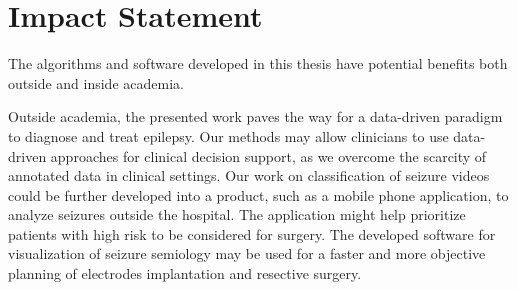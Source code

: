 \chapter{Impact Statement}

The algorithms and software developed in this thesis have potential benefits both outside and inside academia.

Outside academia, the presented work paves the way for a data-driven paradigm to diagnose and treat epilepsy.
Our methods may allow clinicians to use data-driven approaches for clinical decision support, as we overcome the scarcity of annotated data in clinical settings.
Our work on classification of seizure videos could be further developed into a product, such as a mobile phone application, to analyze seizures outside the hospital.
The application might help prioritize patients with high risk to be considered for surgery.
The developed software for visualization of seizure semiology may be used for a faster and more objective planning of electrodes implantation and resective surgery.

